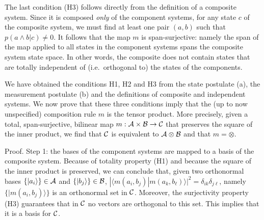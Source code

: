 \documentclass[aps,prl,amsmath,amssymb,twocolumn,nofootinbib]{revtex4}
\theoremstyle{plain}
\theoremstyle{definition}
\theoremstyle{remark}
\def\>{\rangle}
\def\<{\langle}
\begin{document}
The last condition (H3) follows directly from the definition of a
composite system. Since it is composed {\em only} of the component
systems, for any state $c$ of the composite system, we must find at least one pair $(a, b)$ such that $p(a\wedge b | c)\neq 0$. It follows that the map $m$ is span-surjective: namely the
span of the map applied to all states in the component systems spans
the composite system state space. In other words, the composite does
not contain states that are totally independent of (i.e.~orthogonal
to) the states of the components.

We have obtained the conditions H1, H2 and H3 from the state postulate
(a), the measurement postulate (b) and the definitions of composite
and independent systems. We now prove that these three conditions
imply that the (up to now unspecified) composition rule $m$ is the
tensor product. More precisely, given a total, span-surjective,
bilinear map $m:{\cal A}\times{\cal B}\to{\cal C}$ that preserves the
square of the inner product, we find that $\cal C $ is equivalent to
$\cal A \otimes \cal B $ and that $m=\otimes$.

Proof. Step 1: the bases of the component systems are mapped to a basis of
the composite system. Because of totality property (H1) and because
the square of the inner product is preserved, we can conclude that,
given two orthonormal bases $\{|a_i\>\}\in{\cal A}$ and
$\{|b_j\>\}\in{\cal B}$,
$|\<m(a_i,b_j)|m(a_k,b_\ell)\>|^2=\delta_{ik}\delta_{j\ell}$, namely
$\{|m(a_i,b_j)\>\}$ is an orthonormal set in $\cal C$.  Moreover, the
surjectivity property (H3) guarantees that in $\cal C$ no vectors are
orthogonal to this set. This implies that it is a basis for $\cal C$.
\end{document}

